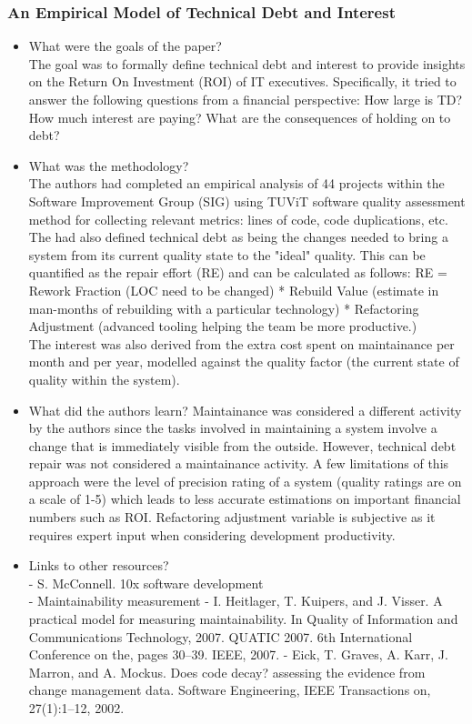 \documentclass{mprop}
\begin{document}
\subsubsection{An Empirical Model of Technical Debt and Interest}  \cite{Nugroho2011}

\begin{itemize}
	\item What were the goals of the paper? \\
	      The goal was to formally define technical debt and interest to provide insights on the Return On Investment (ROI) of IT executives.
	      Specifically, it tried to answer the following questions from a financial perspective: How large is TD? How much interest are paying? What are the consequences of holding on to debt?
	\item What was the methodology? \\
	      The authors had completed an empirical analysis of 44 projects within the Software Improvement Group (SIG) using TUViT software quality assessment method for collecting relevant metrics: lines of code, code duplications, etc.
	      The had also defined technical debt as being the changes needed to bring a system from its current quality state to the "ideal" quality. This can be quantified as the repair effort (RE) and can be calculated as follows:
	      RE = Rework Fraction (LOC need to be changed) * Rebuild Value (estimate in man-months of rebuilding with a particular technology) * Refactoring Adjustment (advanced tooling helping the team be more productive.)\\
	      The interest was also derived from the extra cost spent on maintainance per month and per year, modelled against the quality factor (the current state of quality within the system).
	\item What did the authors learn?
	      Maintainance was considered a different activity by the authors since the tasks involved in maintaining a system involve a change that is immediately visible from the outside.
	      However, technical debt repair was not considered a maintainance activity.
	      A few limitations of this approach were the level of precision rating of a system (quality ratings are on a scale of 1-5) which leads to less accurate estimations on important financial numbers such as ROI.
	      Refactoring adjustment variable is subjective as it requires expert input when considering development productivity.
	\item Links to other resources? \\
	      - S. McConnell. 10x software development \\
	      - Maintainability measurement - I. Heitlager, T. Kuipers, and J. Visser. A practical model for measuring maintainability. In Quality of Information and Communications Technology, 2007. QUATIC 2007. 6th International Conference on the, pages 30–39. IEEE, 2007.
	      - Eick, T. Graves, A. Karr, J. Marron, and A. Mockus. Does code decay? assessing the evidence from change management data. Software Engineering, IEEE Transactions on, 27(1):1–12, 2002.
\end{itemize}
\end{document}
